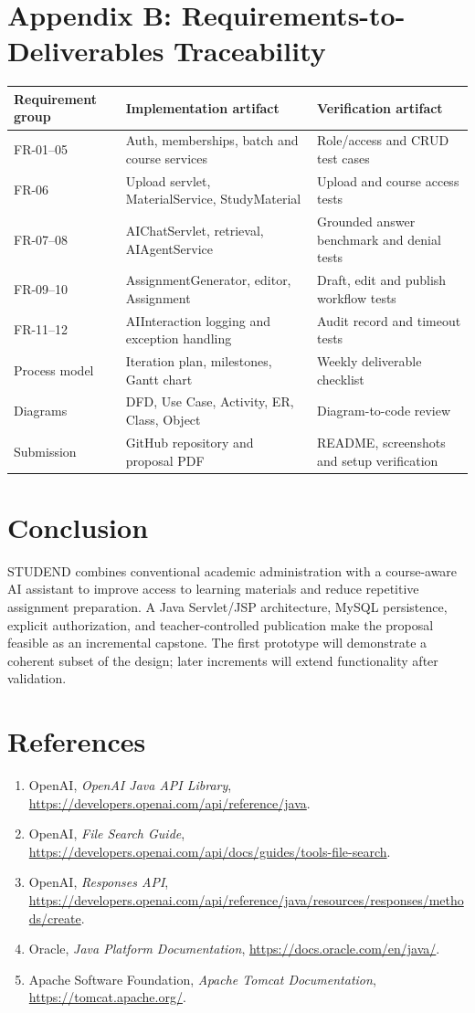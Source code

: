 \documentclass[11pt,a4paper]{article}
\begin{document}
\section{Appendix B: Requirements-to-Deliverables Traceability}
\begin{longtable}{p{}p{}p{}}
\toprule Requirement group & Implementation artifact & Verification artifact\\\midrule\endhead
FR-01--05 & Auth, memberships, batch and course services & Role/access and CRUD test cases\\
FR-06 & Upload servlet, MaterialService, StudyMaterial & Upload and course access tests\\
FR-07--08 & AIChatServlet, retrieval, AIAgentService & Grounded answer benchmark and denial tests\\
FR-09--10 & AssignmentGenerator, editor, Assignment & Draft, edit and publish workflow tests\\
FR-11--12 & AIInteraction logging and exception handling & Audit record and timeout tests\\
Process model & Iteration plan, milestones, Gantt chart & Weekly deliverable checklist\\
Diagrams & DFD, Use Case, Activity, ER, Class, Object & Diagram-to-code review\\
Submission & GitHub repository and proposal PDF & README, screenshots and setup verification\\
\bottomrule
\end{longtable}

\section{Conclusion}
STUDEND combines conventional academic administration with a course-aware AI assistant to improve access to learning materials and reduce repetitive assignment preparation. A Java Servlet/JSP architecture, MySQL persistence, explicit authorization, and teacher-controlled publication make the proposal feasible as an incremental capstone. The first prototype will demonstrate a coherent subset of the design; later increments will extend functionality after validation.
\section{References}
\begin{enumerate}[leftmargin=*,itemsep=2pt]\sloppy\item OpenAI, \emph{OpenAI Java API Library}, \url{https://developers.openai.com/api/reference/java}.\item OpenAI, \emph{File Search Guide}, \url{https://developers.openai.com/api/docs/guides/tools-file-search}.\item OpenAI, \emph{Responses API}, \url{https://developers.openai.com/api/reference/java/resources/responses/methods/create}.\item Oracle, \emph{Java Platform Documentation}, \url{https://docs.oracle.com/en/java/}.\item Apache Software Foundation, \emph{Apache Tomcat Documentation}, \url{https://tomcat.apache.org/}.\end{enumerate}
\end{document}
